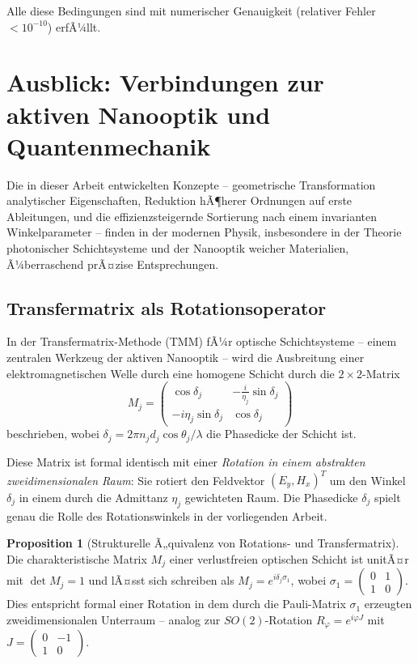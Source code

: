 ﻿\documentclass[12pt, a4paper]{article}
\theoremstyle{definition}
\newtheorem{proposition}{Proposition}[section]
\begin{document}
	Alle diese Bedingungen sind mit numerischer Genauigkeit (relativer Fehler $< 10^{-10}$) erfÃ¼llt.
	
	\section{Ausblick: Verbindungen zur aktiven Nanooptik und Quantenmechanik}
	\label{sec:ausblick}
	
	Die in dieser Arbeit entwickelten Konzepte -- geometrische Transformation
	analytischer Eigenschaften, Reduktion hÃ¶herer Ordnungen auf erste Ableitungen,
	und die effizienzsteigernde Sortierung nach einem invarianten Winkelparameter --
	finden in der modernen Physik, insbesondere in der Theorie photonischer
	Schichtsysteme und der Nanooptik weicher Materialien, Ã¼berraschend prÃ¤zise
	Entsprechungen.
	
	\subsection{Transfermatrix als Rotationsoperator}
	
	In der Transfermatrix-Methode (TMM) fÃ¼r optische Schichtsysteme --
	einem zentralen Werkzeug der aktiven Nanooptik \cite{oqtum} --
	wird die Ausbreitung einer elektromagnetischen Welle durch eine homogene
	Schicht durch die $2\times 2$-Matrix
	\[
	M_j = \begin{pmatrix}
		\cos\delta_j & -\frac{i}{\eta_j}\sin\delta_j \\
		-i\eta_j\sin\delta_j & \cos\delta_j
	\end{pmatrix}
	\]
	beschrieben, wobei $\delta_j = 2\pi n_j d_j \cos\theta_j / \lambda$ die
	Phasedicke der Schicht ist.
	
	Diese Matrix ist formal identisch mit einer \emph{Rotation in einem
		abstrakten zweidimensionalen Raum}: Sie rotiert den Feldvektor
	$(E_y, H_x)^T$ um den Winkel $\delta_j$ in einem durch die Admittanz
	$\eta_j$ gewichteten Raum. Die Phasedicke $\delta_j$ spielt genau die Rolle
	des Rotationswinkels in der vorliegenden Arbeit.
	
	\begin{proposition}[Strukturelle Ã„quivalenz von Rotations- und Transfermatrix]
		\label{prop:aequivalenz}
		Die charakteristische Matrix $M_j$ einer verlustfreien optischen Schicht
		ist unitÃ¤r mit $\det M_j = 1$ und lÃ¤sst sich schreiben als
		$M_j = e^{i\delta_j \sigma_1}$, wobei $\sigma_1 = \begin{pmatrix}0&1\\1&0\end{pmatrix}$.
		Dies entspricht formal einer Rotation in dem durch die Pauli-Matrix $\sigma_1$
		erzeugten zweidimensionalen Unterraum -- analog zur $SO(2)$-Rotation
		$R_\varphi = e^{i\varphi J}$ mit $J = \begin{pmatrix}0&-1\\1&0\end{pmatrix}$.
	\end{proposition}
	
\end{document}
